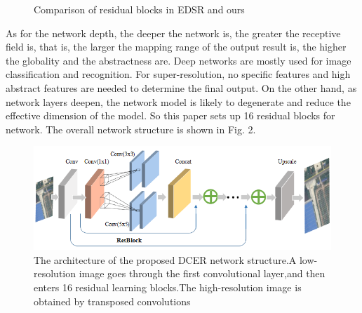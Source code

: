 \documentclass[runningheads,a4paper]{llncs}
\begin{document}
\begin{figure}[htbp]
\centering
{}
\hspace{1cm}
\caption{Comparison of residual blocks in EDSR and ours }
\label{res}
\end{figure}
As for the network depth, the deeper the network is, the greater the receptive field is, that is, the larger the mapping range of the output result is, the higher the globality and the abstractness are. Deep networks are mostly used for image classification and  recognition. For super-resolution, no specific features and high abstract features are needed to determine the final output. On the other hand, as network layers deepen, the network model is likely to degenerate and reduce the effective dimension of the model. So this paper sets up 16 residual blocks for network. The overall network structure is shown in Fig. 2.

\begin{figure}
\centering
\includegraphics[scale=0.4]{pic/network.png}
\caption{The architecture of the proposed DCER network structure.A low-resolution image goes through the first convolutional layer,and then enters 16 residual learning blocks.The high-resolution image is obtained by transposed convolutions  }
\label{fig:example}
\end{figure}
\end{document}
